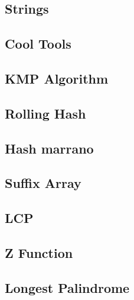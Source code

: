 \documentclass[10pt]{article}
\begin{document}
\begin{multicols*}{2}

\section{Strings}

\subsection{Cool Tools}


\subsection{KMP Algorithm}


\subsection{Rolling Hash}


\subsection{Hash marrano}


\subsection{Suffix Array}


\subsection{LCP}


\subsection{Z Function}


\subsection{Longest Palindrome}



\end{multicols*}
\end{document}
